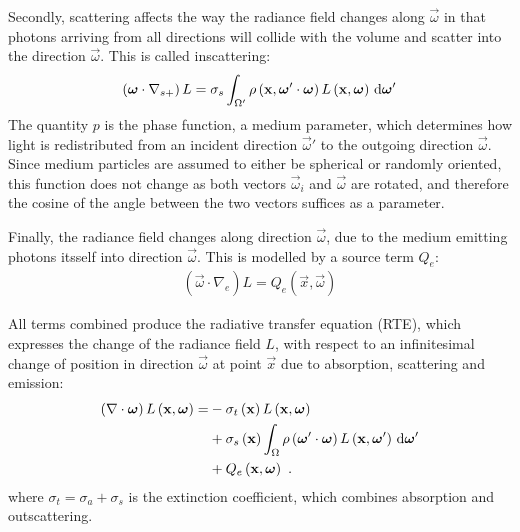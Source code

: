 Secondly, scattering affects the way the radiance field changes along $\vec{\omega}$ in that photons arriving from all directions will collide with the volume and scatter into the direction $\vec{\omega}$. This is called inscattering:
\begin{align}
\left(\boldsymbol{\mathbf{\omega}}\cdot\nabla_{s+}\right)L = \sigma_s \int_{\Omega'}\rho\left(\boldsymbol{\mathbf{x}}, \boldsymbol{\mathbf{\omega}}'\cdot\boldsymbol{\mathbf{\omega}}\right)L\left(\boldsymbol{\mathbf{x}}, \boldsymbol{\mathbf{\omega}} \right)\,\mathrm{d}\boldsymbol{\mathbf{\omega}}'
\label{eq:rte_inscattering}
\end{align}
The quantity $p$ is the phase function, a medium parameter, which determines how light is redistributed from an incident direction $\vec{\omega}'$ to the outgoing direction $\vec{\omega}$. Since medium particles are assumed to either be spherical or randomly oriented, this function does not change as both vectors $\vec{\omega}_i$ and $\vec{\omega}$ are rotated, and therefore the cosine of the angle between the two vectors suffices as a parameter.


Finally, the radiance field changes along direction $\vec{\omega}$, due to the medium emitting photons itsself into direction $\vec{\omega}$. This is modelled by a source term $Q_e$:
\begin{align}
\left(\vec{\omega}\cdot\nabla_{e}\right)L = Q_e\left(\vec{x}, \vec{\omega}\right)
\end{align}

All terms combined produce the radiative transfer equation (RTE), which expresses the change of the radiance field $L$, with respect to an infinitesimal change of position in direction $\vec{\omega}$ at point $\vec{x}$ due to absorption, scattering and emission:
\begin{align}
\left(\nabla\cdot\boldsymbol{\mathbf{\omega}}\right)L\left(\boldsymbol{\mathbf{x}}, \boldsymbol{\mathbf{\omega}} \right)
=&
-\sigma_t\left(\boldsymbol{\mathbf{x}}\right) L\left(\boldsymbol{\mathbf{x}}, \boldsymbol{\mathbf{\omega}} \right)\nonumber\\
&
+\sigma_s\left(\boldsymbol{\mathbf{x}}\right) \int_{\Omega}
{
\rho\left(\boldsymbol{\mathbf{\omega}}'\cdot\boldsymbol{\mathbf{\omega}}\right)L\left(\boldsymbol{\mathbf{x}}, \boldsymbol{\mathbf{\omega}}' \right)\,\mathrm{d}\boldsymbol{\mathbf{\omega}}'
}
\label{eq:rte}
\\
&
+Q_e\left(\boldsymbol{\mathbf{x}}, \boldsymbol{\mathbf{\omega}}\right)
\nonumber
\  .
\end{align}
where $\sigma_t=\sigma_a+\sigma_s$ is the extinction coefficient, which combines absorption and outscattering.

